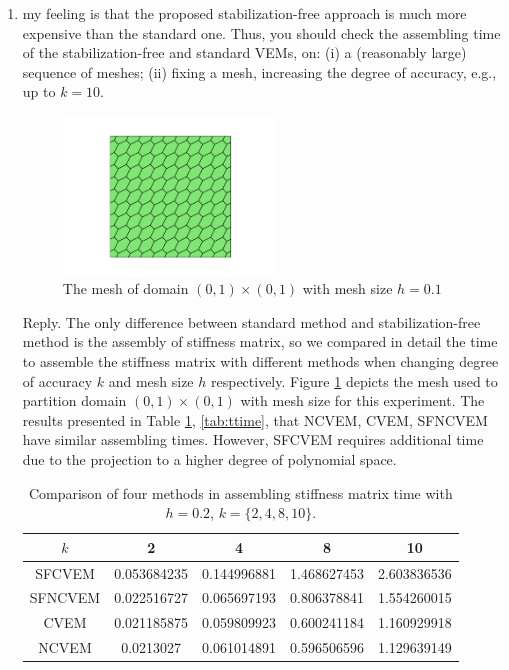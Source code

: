 \documentclass[10pt]{amsart}
\theoremstyle{definition}
\theoremstyle{remark}
\begin{document}
\begin{enumerate}[1.]
\item \textsf{
my feeling is that the proposed stabilization-free approach is much more
expensive than the standard one. Thus, you should check the assembling time
of the stabilization-free and standard VEMs, on: (i) a (reasonably large)
sequence of meshes; (ii) fixing a mesh, increasing the degree of accuracy,
e.g., up to $k = 10$.
}
\begin{figure}[h]
\centering
\includegraphics[width=2.2in]{../figures/poly_mesh.pdf}
\caption{The mesh of domain $(0, 1)\times(0, 1)$ with mesh size  $h = 0.1$ }
  \label{fig:polymesh} %
\end{figure}

\smallskip \noindent \textcolor[rgb]{1.00,0.00,0.00}{Reply.}
The only difference between standard method and stabilization-free method is the
assembly of stiffness matrix,
so we compared in detail the time to assemble the stiffness matrix with
different methods when changing degree of accuracy $k$ and mesh size $h$
respectively. Figure \ref{fig:polymesh} depicts the mesh used to partition domain 
$(0, 1)\times(0, 1)$ with mesh size for this experiment.
The results presented in Table
\ref{tab:ptime}, \ref{tab:ttime}, that
NCVEM, CVEM, SFNCVEM have similar assembling times. 
However, SFCVEM requires additional time due to the projection to a higher
degree of polynomial space.

\begin{table}[htbp]
\caption{Comparison of four methods in assembling stiffness matrix time with
 $h=0.2$, $k = \{2, 4, 8, 10\}$.}
\label{tab:ptime}
\centering
\begin{tabular}{c|cccc}
\toprule
$k$ & 2 & 4 & 8 & 10 \\
\hline
SFCVEM & 0.053684235 & 0.144996881 & 1.468627453 & 2.603836536 \\
SFNCVEM & 0.022516727 & 0.065697193 & 0.806378841 & 1.554260015 \\
CVEM & 0.021185875 & 0.059809923 & 0.600241184 & 1.160929918 \\
NCVEM & 0.0213027 & 0.061014891 & 0.596506596 & 1.129639149 \\
\bottomrule
\end{tabular}
\end{table}


\end{enumerate}
\end{document}

